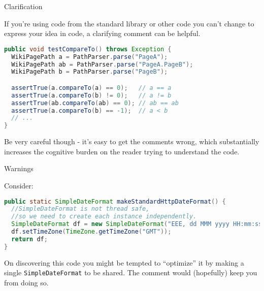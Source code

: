 \documentclass{beamer}
\begin{document}
\begin{frame}[fragile]{Clarification}


If you're using code from the standard library or other code you can't change to express your idea in code, a clarifying comment can be helpful.
\begin{lstlisting}[language=Java]
public void testCompareTo() throws Exception {
  WikiPagePath a = PathParser.parse("PageA");
  WikiPagePath ab = PathParser.parse("PageA.PageB");
  WikiPagePath b = PathParser.parse("PageB");

  assertTrue(a.compareTo(a) == 0);   // a == a
  assertTrue(a.compareTo(b) != 0);   // a != b
  assertTrue(ab.compareTo(ab) == 0); // ab == ab
  assertTrue(a.compareTo(b) == -1);  // a < b
  // ...
}
\end{lstlisting}

Be very careful though - it's easy to get the comments wrong, which substantially increases the cognitive burden on the reader trying to understand the code.

\end{frame}

\begin{frame}[fragile]{Warnings}


Consider:
\begin{lstlisting}[language=Java]
public static SimpleDateFormat makeStandardHttpDateFormat() {
  //SimpleDateFormat is not thread safe,
  //so we need to create each instance independently.
  SimpleDateFormat df = new SimpleDateFormat("EEE, dd MMM yyyy HH:mm:ss z");
  df.setTimeZone(TimeZone.getTimeZone("GMT"));
  return df;
}
\end{lstlisting}
On discovering this code you might be tempted to ``optimize'' it by making a single {\tt SimpleDateFormat} to be shared.  The comment would (hopefully) keep you from doing so.

\end{frame}
\end{document}
